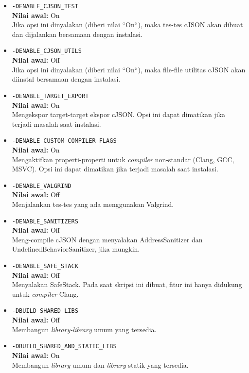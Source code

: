 \begin{itemize}
	\begin{itemize}
		\item \verb|-DENABLE_CJSON_TEST|\\
		\textbf{Nilai awal:} On\\
		Jika opsi ini dinyalakan (diberi nilai ``On``), maka tes-tes cJSON akan dibuat dan dijalankan bersamaan dengan instalasi.
		\item \verb|-DENABLE_CJSON_UTILS|\\
		\textbf{Nilai awal:} Off\\
		Jika opsi ini dinyalakan (diberi nilai ``On``), maka file-file utilitas cJSON akan diinstal  bersamaan dengan instalasi.
		\item \verb|-DENABLE_TARGET_EXPORT|\\
		\textbf{Nilai awal:} On\\
		Mengekspor target-target ekspor cJSON. Opsi ini dapat dimatikan jika terjadi masalah saat instalasi.
		\item \verb|-DENABLE_CUSTOM_COMPILER_FLAGS|\\
		\textbf{Nilai awal:} On\\
		Mengaktifkan properti-properti untuk \textit{compiler} non-standar (Clang, GCC, MSVC). Opsi ini dapat dimatikan jika terjadi masalah saat instalasi.
		\item \verb|-DENABLE_VALGRIND|\\
		\textbf{Nilai awal:} Off\\
		Menjalankan tes-tes yang ada menggunakan \mbox{Valgrind}.
		\item \verb|-DENABLE_SANITIZERS|\\
		\textbf{Nilai awal:} Off\\
		Meng-compile cJSON dengan menyalakan \mbox{AddressSanitizer} dan \mbox{UndefinedBehaviorSanitizer}, jika mungkin.
		\item \verb|-DENABLE_SAFE_STACK|\\
		\textbf{Nilai awal:} Off\\
		Menyalakan SafeStack. Pada saat skripsi ini dibuat, fitur ini hanya didukung untuk \textit{compiler} Clang.
		\item \verb|-DBUILD_SHARED_LIBS|\\
		\textbf{Nilai awal:} Off\\
		Membangun \textit{library-library} umum yang tersedia.
		\item \verb|-DBUILD_SHARED_AND_STATIC_LIBS|\\
		\textbf{Nilai awal:} On\\
		Membangun \textit{library} umum dan \textit{library} statik yang tersedia.

\end{itemize}
\end{itemize}
